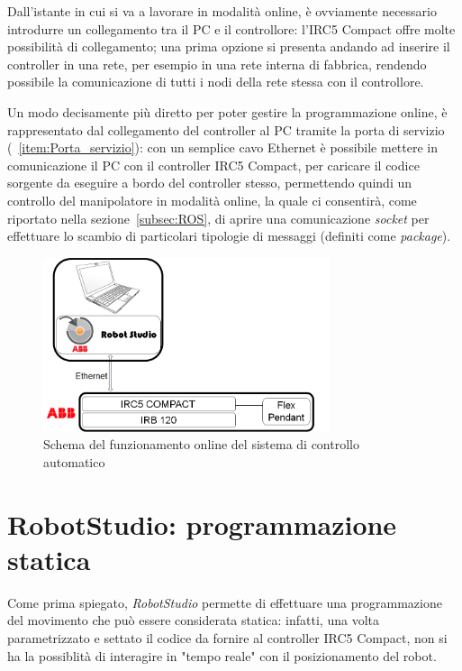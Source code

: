 Dall'istante in cui si va a lavorare in modalità online, è ovviamente necessario introdurre un collegamento tra il PC e il controllore: l'IRC5 Compact offre molte possibilità di collegamento; una prima opzione si presenta andando ad inserire il controller in una rete, per esempio in una rete interna di fabbrica, rendendo possibile la comunicazione di tutti i nodi della rete stessa con il controllore. 

Un modo decisamente più diretto per poter gestire la programmazione online, è rappresentato dal collegamento del controller al PC tramite la porta di servizio (~\vref{item:Porta_servizio}): con un semplice cavo Ethernet è possibile mettere in comunicazione il PC con il controller IRC5 Compact, per caricare il codice sorgente da eseguire a bordo del controller stesso, permettendo quindi un controllo del manipolatore in modalità online, la quale ci consentirà, come riportato nella sezione~\vref{subsec:ROS}, di aprire una comunicazione \emph{socket} per effettuare lo scambio di particolari tipologie di messaggi (definiti come \emph{package}).
\begin{figure}
	\centering
	\includegraphics[width=0.75\textwidth]{Immagini/Automatic_SystemSchematic}
	\caption{Schema del funzionamento online del sistema di controllo automatico}
	\label{fig:SchematicAutomatic}
\end{figure}

\chapter{RobotStudio: programmazione statica}
\label{text:RAPID}
Come prima spiegato, \emph{RobotStudio} permette di effettuare una programmazione del movimento che può essere considerata statica: infatti, una volta parametrizzato e settato il codice da fornire al controller IRC5 Compact, non si ha la possiblità di interagire in "tempo reale" con il posizionamento del robot.

